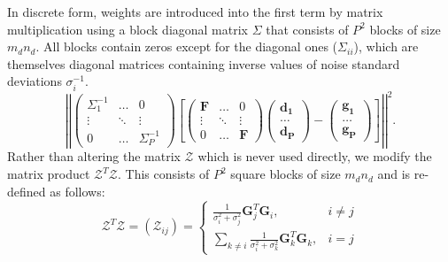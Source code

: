 \documentclass[12pt,notitlepage]{report}
\begin{document}
In discrete form, weights are introduced into the first term by matrix multiplication using a block diagonal matrix $\Sigma$ that consists of $P^2$ blocks of size $m_d n_d$. All blocks contain zeros except for the diagonal ones ($\Sigma_{ii}$), which are themselves diagonal matrices containing inverse values of noise standard deviations $\sigma_i^{-1}$. 
\begin{equation}
\label{eq:srou03_R_ext}
	\left|\left| \begin{pmatrix} \Sigma_1^{-1} & \hdots & 0 \\ \vdots & \ddots & \vdots \\ 0 & \hdots & \Sigma_P^{-1} \end{pmatrix} \left[ \begin{pmatrix} \mathbf{F} & \hdots & 0 \\ \vdots & \ddots & \vdots \\ 0 & \hdots & \mathbf{F} \end{pmatrix}  \begin{pmatrix} \mathbf{d_1} \\ \hdots \\ \mathbf{d_P} \end{pmatrix} - \begin{pmatrix} \mathbf{g_1} \\ \hdots \\ \mathbf{g_P} \end{pmatrix} \right] \right|\right|^2\text{.} 
\end{equation}
Rather than altering the matrix $\mathcal{Z}$ which is never used directly, we modify the matrix product $\mathcal{Z}^T\mathcal{Z}$. This consists of $P^2$ square blocks of size $m_d n_d$ and is re-defined as follows:
\begin{equation}
\label{eq:srou03_R_ext}
	\mathcal{Z}^T\mathcal{Z} = ( \mathcal{Z}_{ij} ) = 
	\begin{cases} 
		\frac{1}{\sigma_i^2 + \sigma_j^2}\mathbf{G}_j^T\mathbf{G}_i^{}, & i \neq j \\ 
		\sum_{k \neq i}^{}\frac{1}{\sigma_i^2 + \sigma_k^2}\mathbf{G}_k^T\mathbf{G}_k^{}, & i = j  
	\end{cases}
	\end{equation}
\end{document}
